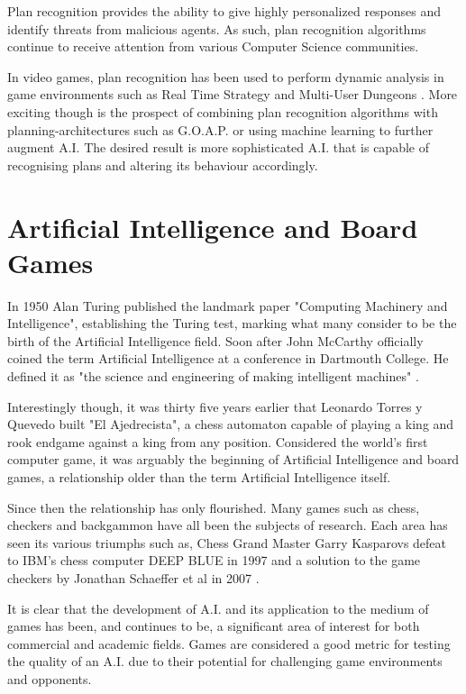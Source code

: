 \documentclass[parskip]{cs4rep}
\begin{document}
Plan recognition provides the ability to give highly personalized responses and identify threats from malicious agents. As such, plan recognition algorithms continue to receive attention from various Computer Science communities. 

In video games, plan recognition has been used to perform dynamic analysis in game environments such as Real Time Strategy \cite{conf/aiide/SynnaeveB11} and Multi-User Dungeons \cite{Albrecht:1998:BMK:598277.598308}. More exciting though is the prospect of combining plan recognition algorithms with planning-architectures such as G.O.A.P. or using machine learning to further augment A.I. The desired result is more sophisticated A.I. that is capable of recognising plans and altering its behaviour accordingly. 

\section{Artificial Intelligence and Board Games}

In 1950 Alan Turing published the landmark paper "Computing Machinery and Intelligence", establishing the Turing test, marking what many consider to be the birth of the Artificial Intelligence field. Soon after John McCarthy officially coined the term Artificial Intelligence at a conference in Dartmouth College. He defined it as "the science and engineering of making intelligent machines" \cite{mccarthai}.

Interestingly though, it was thirty five years earlier that Leonardo Torres y Quevedo built "El Ajedrecista", a chess automaton capable of playing a king and rook endgame against a king from any position. Considered the world's first computer game, it was arguably the beginning of Artificial Intelligence and board games, a relationship older than the term Artificial Intelligence itself.  

Since then the relationship has only flourished. Many games such as chess, checkers and backgammon have all been the subjects of research. Each area has seen its various triumphs such as, Chess Grand Master Garry Kasparovs defeat to IBM's chess computer DEEP BLUE in 1997 \cite{aaai/1997w6} and a solution to the game checkers by Jonathan Schaeffer et al in 2007 \cite{SchaefferBBK0LLS05} .

It is clear that the development of A.I. and its application to the medium of games has been, and continues to be, a significant area of interest for both commercial and academic fields. Games are considered a good metric for testing the quality of an A.I. due to their potential for challenging game environments and opponents.
\end{document}
